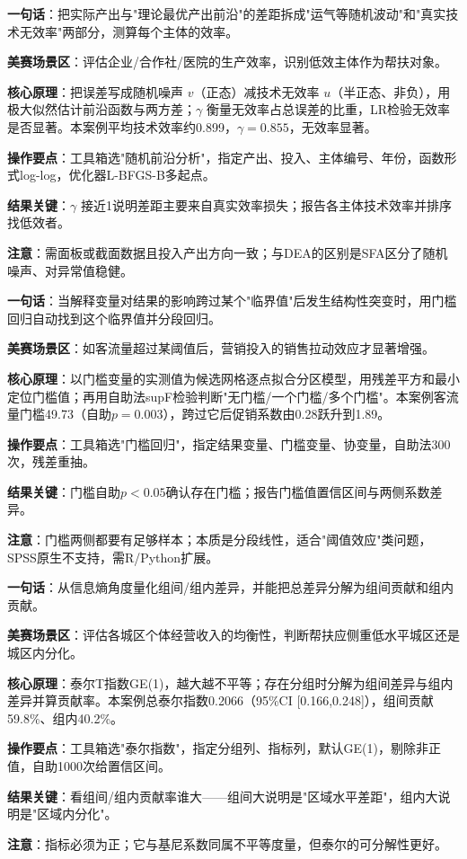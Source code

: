 \begin{algobrief}
\textbf{一句话}：把实际产出与"理论最优产出前沿"的差距拆成"运气等随机波动"和"真实技术无效率"两部分，测算每个主体的效率。

\textbf{美赛场景区}：评估企业/合作社/医院的生产效率，识别低效主体作为帮扶对象。

\textbf{核心原理}：把误差写成随机噪声 $v$（正态）减技术无效率 $u$（半正态、非负），用极大似然估计前沿函数与两方差；$\gamma$ 衡量无效率占总误差的比重，LR检验无效率是否显著。本案例平均技术效率约0.899，$\gamma=0.855$，无效率显著。

\textbf{操作要点}：工具箱选"随机前沿分析"，指定产出、投入、主体编号、年份，函数形式log-log，优化器L-BFGS-B多起点。

\textbf{结果关键}：$\gamma$ 接近1说明差距主要来自真实效率损失；报告各主体技术效率并排序找低效者。

\textbf{注意}：需面板或截面数据且投入产出方向一致；与DEA的区别是SFA区分了随机噪声、对异常值稳健。
\end{algobrief}


\begin{algobrief}
\textbf{一句话}：当解释变量对结果的影响跨过某个"临界值"后发生结构性突变时，用门槛回归自动找到这个临界值并分段回归。

\textbf{美赛场景区}：如客流量超过某阈值后，营销投入的销售拉动效应才显著增强。

\textbf{核心原理}：以门槛变量的实测值为候选网格逐点拟合分区模型，用残差平方和最小定位门槛值；再用自助法supF检验判断"无门槛/一个门槛/多个门槛"。本案例客流量门槛49.73（自助$p=0.003$），跨过它后促销系数由0.28跃升到1.89。

\textbf{操作要点}：工具箱选"门槛回归"，指定结果变量、门槛变量、协变量，自助法300次，残差重抽。

\textbf{结果关键}：门槛自助$p<0.05$确认存在门槛；报告门槛值置信区间与两侧系数差异。

\textbf{注意}：门槛两侧都要有足够样本；本质是分段线性，适合"阈值效应"类问题，SPSS原生不支持，需R/Python扩展。
\end{algobrief}


\begin{algobrief}
\textbf{一句话}：从信息熵角度量化组间/组内差异，并能把总差异分解为组间贡献和组内贡献。

\textbf{美赛场景区}：评估各城区个体经营收入的均衡性，判断帮扶应侧重低水平城区还是城区内分化。

\textbf{核心原理}：泰尔T指数GE(1)，越大越不平等；存在分组时分解为组间差异与组内差异并算贡献率。本案例总泰尔指数0.2066（95\%CI [0.166,0.248]），组间贡献59.8\%、组内40.2\%。

\textbf{操作要点}：工具箱选"泰尔指数"，指定分组列、指标列，默认GE(1)，剔除非正值，自助1000次给置信区间。

\textbf{结果关键}：看组间/组内贡献率谁大——组间大说明是"区域水平差距"，组内大说明是"区域内分化"。

\textbf{注意}：指标必须为正；它与基尼系数同属不平等度量，但泰尔的可分解性更好。
\end{algobrief}


